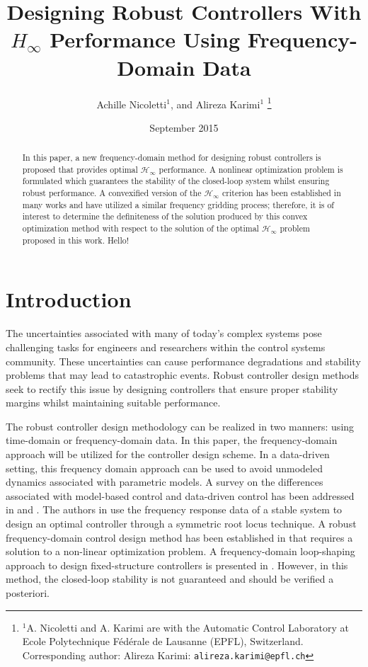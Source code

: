 \documentclass[letterpaper, 10 pt, conference]{ieeeconf}  %
\title{Designing Robust Controllers With $H_{\infty}$ Performance Using Frequency-Domain Data}
\author{Achille Nicoletti$^{1}$, and Alireza Karimi$^{1}$
\thanks{$^{1}$A. Nicoletti and A. Karimi are with the Automatic Control Laboratory at Ecole Polytechnique F\'ed\'erale de Lausanne (EPFL), Switzerland.
       Corresponding author: Alireza Karimi: {\tt\small alireza.karimi@epfl.ch}}
\date{September 2015}
}
\begin{document}
\maketitle
\thispagestyle{empty}
\pagestyle{empty}


\begin{abstract}
In this paper, a new frequency-domain method for designing robust controllers is proposed that provides optimal $\mathcal{H}_{\infty}$ performance. A nonlinear optimization problem is formulated which guarantees the stability of the closed-loop system whilst ensuring robust performance. A convexified version of the $\mathcal{H}_{\infty}$ criterion has been established in many works and have utilized a similar frequency gridding process; therefore, it is of interest to determine the definiteness of the solution produced by this convex optimization method with respect to the solution of the optimal $\mathcal{H}_{\infty}$ problem proposed in this work. 
Hello!
\end{abstract}


\section{Introduction}
The uncertainties associated with many of today's complex systems pose challenging tasks for engineers and researchers within the control systems community. These uncertainties can cause performance degradations and stability problems that may lead to catastrophic events. Robust controller design methods seek to rectify this issue by designing controllers that ensure proper stability margins whilst maintaining suitable performance. 

The robust controller design methodology can be realized in two manners: using time-domain or frequency-domain data. In this paper, the frequency-domain approach will be utilized for the controller design scheme. In a data-driven setting, this frequency domain approach can be used to avoid unmodeled dynamics associated with parametric models. A survey on the differences associated with model-based control and data-driven control has been addressed in \cite{HW13} and \cite{BCE12}. The authors in \cite{HDAV10} use the frequency response data of a stable system to design an optimal controller through a symmetric root locus technique. A robust frequency-domain control design method has been established in \cite{KNND13b} that requires a solution to a non-linear optimization problem. A frequency-domain loop-shaping approach to design fixed-structure controllers is presented in \cite{KNND13c}. However, in this method, the closed-loop stability is not guaranteed and should be verified a posteriori.
\end{document}
